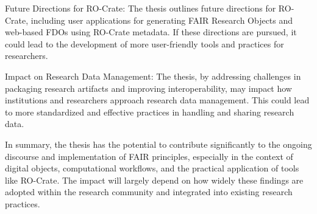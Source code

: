     Future Directions for RO-Crate: The thesis outlines future directions for RO-Crate, including user applications for generating FAIR Research Objects and web-based FDOs using RO-Crate metadata. If these directions are pursued, it could lead to the development of more user-friendly tools and practices for researchers.

    Impact on Research Data Management: The thesis, by addressing challenges in packaging research artifacts and improving interoperability, may impact how institutions and researchers approach research data management. This could lead to more standardized and effective practices in handling and sharing research data.

In summary, the thesis has the potential to contribute significantly to the ongoing discourse and implementation of FAIR principles, especially in the context of digital objects, computational workflows, and the practical application of tools like RO-Crate. The impact will largely depend on how widely these findings are adopted within the research community and integrated into existing research practices.
